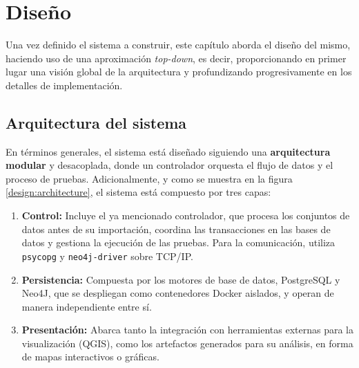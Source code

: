 
\chapter{Diseño} \label{chapter:design}

Una vez definido el sistema a construir, este capítulo aborda el diseño del mismo, haciendo uso de una aproximación \textit{top-down}, es decir, proporcionando en primer lugar una visión global de la arquitectura y profundizando progresivamente en los detalles de implementación.

\section{Arquitectura del sistema}

En términos generales, el sistema está diseñado siguiendo una \textbf{arquitectura modular} y desacoplada, donde un controlador orquesta el flujo de datos y el proceso de pruebas. Adicionalmente, y como se muestra en la figura \ref{design:architecture}, el sistema está compuesto por tres capas:

\begin{enumerate}
    \item \textbf{Control:} Incluye el ya mencionado controlador, que procesa los conjuntos de datos antes de su importación, coordina las transacciones en las bases de datos y gestiona la ejecución de las pruebas. Para la comunicación, utiliza \texttt{psycopg} y \texttt{neo4j-driver} sobre TCP/IP.
    \item \textbf{Persistencia:} Compuesta por los motores de base de datos, PostgreSQL\cite{postgres} y Neo4J\cite{neo4j}, que se despliegan como contenedores Docker aislados, y operan de manera independiente entre sí.
    \item \textbf{Presentación:} Abarca tanto la integración con herramientas externas para la visualización (QGIS), como los artefactos generados para su análisis, en forma de mapas interactivos o gráficas.
\end{enumerate}

